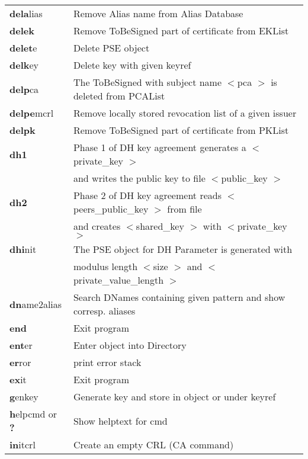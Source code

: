 \begin{tabular}{ll}
{\bf dela}lias     & Remove Alias name from Alias Database               	       \\
{\bf delek}        & Remove ToBeSigned part of certificate from EKList    	       \\
{\bf delet}e       & Delete PSE object                                                 \\
{\bf delk}ey       & Delete key with given keyref                                      \\
{\bf delp}ca       & The ToBeSigned with subject name $<$pca $>$ is deleted from PCAList    \\
{\bf delpe}mcrl    & Remove locally stored revocation list of a given issuer           \\
{\bf delpk}        & Remove ToBeSigned part of certificate from PKList    	       \\
{\bf dh1}          & Phase 1 of DH key agreement generates a $<$private\_key $>$            \\
                   & and writes the public key to file $<$public\_key $>$                   \\
{\bf dh2}          & Phase 2 of DH key agreement reads $<$peers\_public\_key $>$ from file  \\
                   & and creates $<$shared\_key $>$ with $<$private\_key $>$                     \\
{\bf dhi}nit       & The PSE object for DH Parameter is generated with                 \\
                   &  modulus length $<$size $>$ and $<$private\_value\_length $>$               \\
{\bf dn}ame2alias  & Search DNames containing given pattern and show corresp. aliases  \\
{\bf end}          & Exit program                                                      \\
{\bf ent}er	   & Enter object into Directory				       \\
{\bf er}ror        & print error stack                                                 \\
{\bf ex}it         & Exit program                                                      \\
{\bf g}enkey       & Generate key and store in object or under keyref                  \\
{\bf h}elpcmd or {\bf ?} & Show helptext for cmd                                       \\
{\bf in}itcrl      & Create an empty CRL (CA command)                               \\

\end{tabular}
